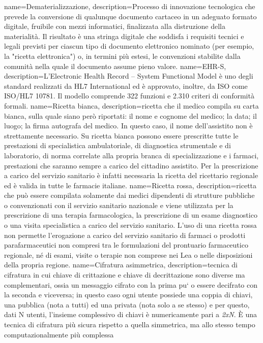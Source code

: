 %
%
%
{
	name=Dematerializzazione,
	description={Processo di innovazione tecnologica che prevede la conversione di qualunque documento cartaceo in un adeguato formato digitale, fruibile con mezzi informatici, finalizzata alla distruzione della materialità. Il risultato è una stringa digitale che soddisfa i requisiti tecnici e legali previsti per ciascun tipo di documento elettronico nominato (per esempio, la "ricetta elettronica") o, in termini più estesi, le convenzioni stabilite dalla comunità nella quale il documento assume pieno valore.}
}
{
	name=EHR-S,
	description={L’Electronic Health Record – System Functional Model è uno degli standard realizzati da HL7 International ed è approvato, inoltre, da ISO come ISO/HL7 10781. Il modello
	comprende 322 funzioni e 2.310 criteri di conformità formali.}
}
{
	name=Ricetta bianca,
	description={ricetta che il medico compila su carta bianca, sulla quale siano però riportati: il nome e cognome del medico; la data; il luogo; la firma autografa del medico. In questo caso, il nome dell’assistito non è strettamente necessario. Su ricetta bianca possono essere prescritte tutte le prestazioni di specialistica ambulatoriale, di diagnostica strumentale e di laboratorio, di norma correlate alla propria branca di specializzazione e i farmaci, prestazioni che saranno sempre a carico del cittadino assistito. Per la prescrizione a carico del servizio sanitario è infatti necessaria la ricetta del ricettario regionale ed è valida in tutte le farmacie italiane.}
}
{
	name=Ricetta rossa,
	description={ricetta che può essere compilata solamente dai medici dipendenti di strutture pubbliche o convenzionati con il servizio sanitario nazionale e viene utilizzata per la prescrizione di una terapia farmacologica, la prescrizione di un esame diagnostico o una visita specialistica a carico del servizio sanitario. L’uso di una ricetta rossa non permette l’erogazione a carico del servizio sanitario di farmaci o prodotti parafarmaceutici non compresi tra le formulazioni del prontuario farmaceutico regionale, né di esami, visite o terapie non comprese nei Lea o nelle disposizioni della propria regione.}
}
{
	name={Cifratura asimmetrica},
	description={tecnica di cifratura in cui chiave di crittazione e chiave di decrittazione sono diverse ma complementari, ossia un messaggio cifrato con la prima pu` o essere decifrato con la seconda e viceversa; in questo caso ogni utente possiede una coppia di chiavi, una pubblica (nota a tutti) ed una privata (nota solo a se stesso) e per questo, dati N utenti, l’insieme complessivo di chiavi è numericamente pari a \emph{2xN}. È una tecnica di cifratura più sicura rispetto a quella simmetrica, ma allo stesso tempo computazionalmente più complessa}
}

